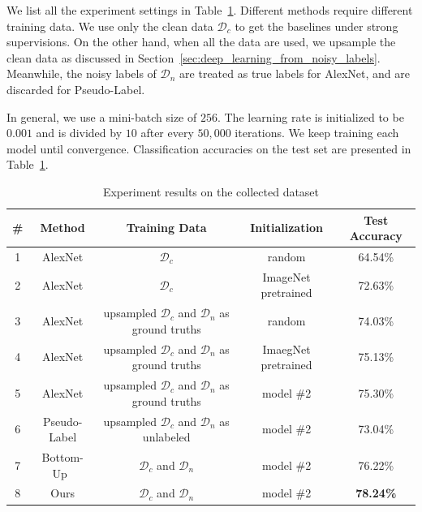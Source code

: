 \documentclass[10pt,twocolumn,letterpaper]{article}
\begin{document}
We list all the experiment settings in Table~\ref{tab:exp}. Different methods require different training data. We use only the clean data $\mathcal{D}_c$ to get the baselines under strong supervisions. On the other hand, when all the data are used, we upsample the clean data as discussed in Section~\ref{sec:deep_learning_from_noisy_labels}. Meanwhile, the noisy labels of $\mathcal{D}_n$ are treated as true labels for AlexNet, and are discarded for Pseudo-Label.

In general, we use a mini-batch size of $256$. The learning rate is initialized to be $0.001$ and is divided by $10$ after every $50,000$ iterations. We keep training each model until convergence. Classification accuracies on the test set are presented in Table~\ref{tab:exp}.

\begin{table}[t]
\begin{center}
\begin{tabular}{c|c|c|c|c}
\hline
\# & Method & Training Data & Initialization & Test Accuracy\\
\hline\hline
1 & AlexNet & $\mathcal{D}_c$ & random & 64.54\% \\
2 & AlexNet & $\mathcal{D}_c$ & ImageNet pretrained & 72.63\% \\
3 & AlexNet & upsampled $\mathcal{D}_c$ and $\mathcal{D}_n$ as ground truths & random & 74.03\% \\
4 & AlexNet & upsampled $\mathcal{D}_c$ and $\mathcal{D}_n$ as ground truths & ImaegNet pretrained & 75.13\% \\
5 & AlexNet & upsampled $\mathcal{D}_c$ and $\mathcal{D}_n$ as ground truths & model \#2 & 75.30\% \\
6 & Pseudo-Label\cite{lee2013pseudo} & upsampled $\mathcal{D}_c$ and $\mathcal{D}_n$ as unlabeled & model \#2 & 73.04\% \\
7 & Bottom-Up~\cite{sukhbaatar2014learning} & $\mathcal{D}_c$ and $\mathcal{D}_n$ & model \#2 & 76.22\% \\
8 & Ours & $\mathcal{D}_c$ and $\mathcal{D}_n$ & model \#2 & \textbf{78.24\%} \\
\hline
\end{tabular}
\end{center}
\caption{Experiment results on the collected dataset}
\label{tab:exp}
\end{table}
\end{document}
